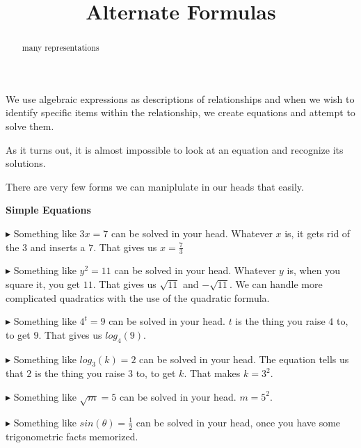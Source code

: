 \documentclass{ximera}
\title{Alternate Formulas}
\begin{document}
\begin{abstract}
many representations
\end{abstract}
\maketitle





We use algebraic expressions as descriptions of relationships and when we wish to identify specific items within the relationship, we create equations and attempt to solve them.

As it turns out, it is almost impossible to look at an equation and recognize its solutions.


There are very few forms we can maniplulate in our heads that easily.



\begin{summary} \textbf{Simple Equations}

$\blacktriangleright$ Something like $3x = 7$ can be solved in your head.  Whatever $x$ is, it gets rid of the $3$ and inserts a $7$.  That gives us $x =\frac{7}{3}$





$\blacktriangleright$ Something like $y^2 = 11$ can be solved in your head.  Whatever $y$ is, when you square it, you get $11$.  That gives us $\sqrt{11}$ and $-\sqrt{11}$.  We can handle more complicated  quadratics with the use of the quadratic formula.




$\blacktriangleright$ Something like $4^t = 9$ can be solved in your head.  $t$ is the thing you raise $4$ to, to get $9$.  That gives us $log_4(9)$.



$\blacktriangleright$ Something like $log_3(k) = 2$ can be solved in your head.  The equation tells us that $2$ is the thing you raise $3$ to, to get $k$.  That makes $k = 3^2$.



$\blacktriangleright$ Something like $\sqrt{m} = 5$ can be solved in your head.  $m = 5^2$.


$\blacktriangleright$ Something like $sin(\theta) = \frac{1}{2}$ can be solved in your head, once you have some trigonometric facts memorized.


\end{summary}
\end{document}
